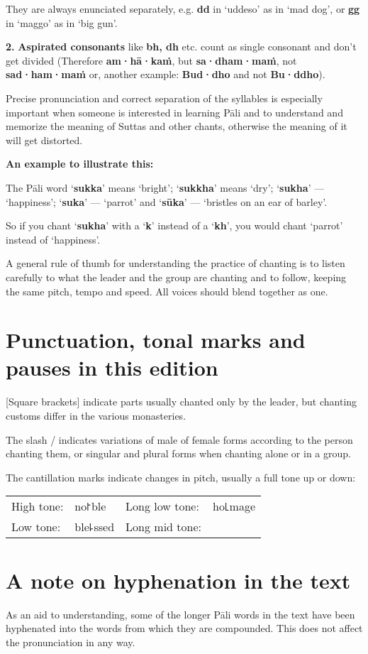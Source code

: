 They are always enunciated separately, e.g. \textbf{dd} in ‘uddeso’ as
in ‘mad dog’, or \textbf{gg} in ‘maggo’ as in ‘big gun’.

\textbf{2.} \textbf{Aspirated consonants} like \textbf{bh, dh} etc.
count as single consonant and don't get divided (Therefore
\textbf{am·hā·kaṁ}, but \textbf{sa·dham·maṁ}, not \textbf{sad·ham·maṁ}
or, another example: \textbf{Bud·dho} and not \textbf{Bu·ddho}).

Precise pronunciation and correct separation of the syllables is
especially important when someone is interested in learning Pāli and to
understand and memorize the meaning of Suttas and other chants,
otherwise the meaning of it will get distorted.

\textbf{An example to illustrate this:}

The Pāli word ‘\textbf{sukka}’ means ‘bright’; ‘\textbf{sukkha}’ means
‘dry’; ‘\textbf{sukha}’ --- ‘happiness’; ‘\textbf{suka}’ --- ‘parrot’ and
‘\textbf{sūka}’ --- ‘bristles on an ear of barley’.

So if you chant ‘\textbf{sukha}’ with a ‘\textbf{k}’ instead of a
‘\textbf{kh}’, you would chant ‘parrot’ instead of ‘happiness’.

A general rule of thumb for understanding the practice of chanting is to
listen carefully to what the leader and the group are chanting and to
follow, keeping the same pitch, tempo and speed. All voices should blend
together as one.

\section{Punctuation, tonal marks and pauses in this edition}

[Square brackets] indicate parts usually chanted only by the leader, but
chanting customs differ in the various monasteries.

The slash / indicates variations of male of female forms according to
the person chanting them, or singular and plural forms when chanting
alone or in a group.

The cantillation marks indicate changes in pitch, usually a full tone up or down:

\begin{tabular}{llll}
	High tone: & no꜓ble & Long low tone: & ho꜖mage\\
	Low tone: & ble꜕ssed & Long mid tone: & \prul{guides}\\
\end{tabular}

\section{A note on hyphenation in the text}

As an aid to understanding, some of the longer Pāli words in the text have been
hyphenated into the words from which they are compounded. This does not affect
the pronunciation in any way.
